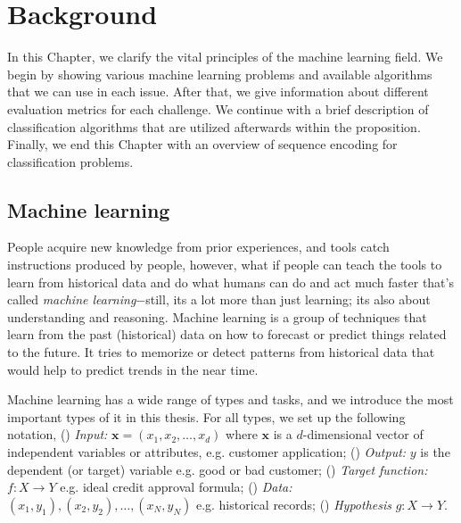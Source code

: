 
\chapter{Background} \label{ch2} %
In this Chapter, we clarify the vital principles of the machine learning field. We begin by showing various machine learning problems and available algorithms that we can use in each issue. After that, we give information about different evaluation metrics for each challenge. We continue with a brief description of classification algorithms that are utilized afterwards within the proposition. Finally, we end this Chapter with an overview of sequence encoding for classification problems.

\ifpdf
    \graphicspath{{X/figures/PNG/}{X/figures/PDF/}{X/figures/}}
\else
    \graphicspath{{X/figures/EPS/}{X/figures/}}
\fi



\section{Machine learning}
People acquire new knowledge from prior experiences, and tools catch instructions produced by people, however, what if people can teach the tools to learn from historical data and do what humans can do and act much faster that's called \textit{machine learning}$-$still, its a lot more than just learning; its also about understanding and reasoning. Machine learning is a group of techniques that learn from the past (historical) data on how to forecast or predict things related to the future. It tries to memorize or detect patterns from historical data that would help to predict trends in the near time.

Machine learning has a wide range of types and tasks, and we introduce the most important types of it in this thesis. For all types, we set up the following notation, () \textit{Input:} $\textbf{x} = (x_1, x_2, \dots, x_d)$ where $\textbf{x}$ is a $d$-dimensional vector of independent variables or attributes, e.g. customer application; () \textit{Output:} $y$ is the dependent (or target) variable e.g. good or bad customer; () \textit{Target function:} $f: X \to Y$ e.g. ideal credit approval formula; () \textit{Data:} $(x_1, y_1), (x_2, y_2), \dots, (x_N, y_N)$ e.g. historical records; () \textit{Hypothesis} $g: X \to Y$.


